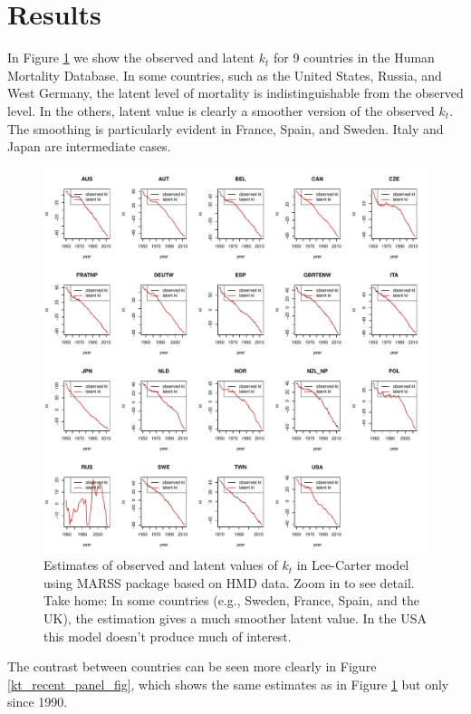 \documentclass[12pt]{article}
\begin{document}
\section{Results}

In Figure \ref{kt_panel_fig} we show the observed and latent $k_t$ for
9 countries in the Human Mortality Database. In some countries, such
as the United States, Russia, and West Germany, the latent level of
mortality is indistinguishable from the observed level. In the others, 
latent value is clearly a smoother version of the observed $k_t$. The
smoothing is particularly evident in France, Spain, and Sweden. Italy
and Japan are intermediate cases.

\begin{figure}

  \includegraphics[width=1.05\textwidth]{./kt_panel_fig.pdf}
  \caption{Estimates of observed and latent values of $k_t$ in
    Lee-Carter model using MARSS package based on HMD data. Zoom in to
    see detail. Take home: In some countries (e.g., Sweden, France,
    Spain, and the UK), the estimation gives a much smoother latent
    value. In the USA this model doesn't produce much of interest.}
    \label{kt_panel_fig}
\end{figure}


The contrast between countries can be seen more clearly in Figure
\ref{kt_recent_panel_fig}, which shows the same estimates as in Figure
\ref{kt_panel_fig} but only since 1990.
\end{document}
